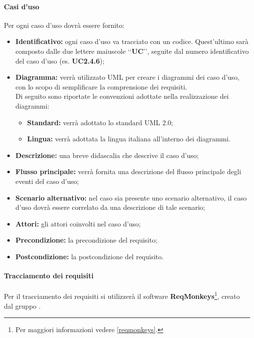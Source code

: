 \paragraph{Casi d'uso\\}
\label{casi d'uso}
Per ogni caso d'uso\glossario{} dovrà essere fornito:
\begin{itemize}
\item\textbf{Identificativo:} ogni caso d'uso\glossario{} va tracciato con un codice. Quest'ultimo sarà composto dalle due lettere maiuscole \lq\lq{}\textbf{UC}\rq\rq{}, seguite dal numero identificativo del caso d'uso\glossario{} (es. \textbf{UC2.4.6});
\item\textbf{Diagramma:} verrà utilizzato UML\glossario{} per creare i diagrammi dei caso d'uso\glossario{}, con lo scopo di semplificare la comprensione dei requisiti.
\\Di seguito sono riportate le convenzioni adottate nella realizzazione dei diagrammi:
\begin{itemize}
\item\textbf{Standard:} verrà adottato lo standard UML\glossario{} 2.0;
\item\textbf{Lingua:} verrà adottata la lingua italiana all'interno dei diagrammi. 
\end{itemize}
\item\textbf{Descrizione:} una breve didascalia che descrive il caso d'uso\glossario{};
\item\textbf{Flusso principale:} verrà fornita una descrizione del flusso principale degli eventi del caso d'uso\glossario{};
\item\textbf{Scenario alternativo:} nel caso sia presente uno scenario alternativo, il caso d'uso\glossario{} dovrà essere correlato da una descrizione di tale scenario;
\item\textbf{Attori:} gli attori coinvolti nel caso d'uso\glossario{};
\item\textbf{Precondizione:} la precondizione del requisito;
\item\textbf{Postcondizione:} la postcondizione del requisito.
\end{itemize}

\paragraph{Tracciamento dei requisiti\\}
\label{tracc_req}
Per il tracciamento dei requisiti si utilizzerà il software \textbf{ReqMonkeys}\footnote{Per maggiori informazioni vedere \ref{reqmonkeys}.}, creato dal gruppo \authorName{}.

